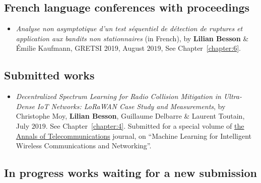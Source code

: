 \subsection*{French language conferences with proceedings}

\begin{itemize}
\item
    \emph{Analyse non asymptotique d'un test séquentiel de détection de ruptures et application aux bandits non stationnaires} (in French),
    by \textbf{Lilian Besson} \& Émilie Kaufmann,
    GRETSI 2019,
    August $2019$,
    See Chapter~\ref{chapter:6}.
    \cite{Besson2019Gretsi}

\end{itemize}


\subsection*{Submitted works}

\begin{itemize}

\item
    \emph{Decentralized Spectrum Learning for Radio Collision Mitigation in Ultra-Dense IoT Networks: LoRaWAN Case Study and Measurements},
    by Christophe Moy, \textbf{Lilian Besson}, Guillaume Delbarre \& Laurent Toutain,
    July $2019$.
    See Chapter~\ref{chapter:4}.
    Submitted for a special volume of \href{https://annalsoftelecommunications.wp.imt.fr/}{the Annals of Telecommunications} journal, on ``Machine Learning for Intelligent Wireless Communications and Networking''.
    \cite{MoyBesson2019Annales}


\end{itemize}


\subsection*{In progress works waiting for a new submission}

